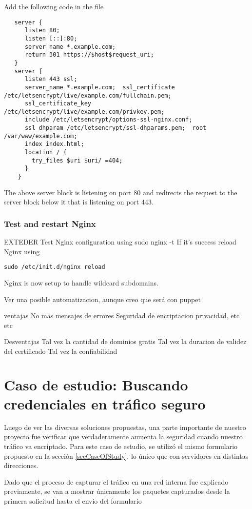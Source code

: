 Add the following code in the file

\begin{verbatim}
   server {
      listen 80;
      listen [::]:80;
      server_name *.example.com;
      return 301 https://$host$request_uri;
   }
   server {
      listen 443 ssl;
      server_name *.example.com;  ssl_certificate /etc/letsencrypt/live/example.com/fullchain.pem;
      ssl_certificate_key /etc/letsencrypt/live/example.com/privkey.pem;
      include /etc/letsencrypt/options-ssl-nginx.conf;
      ssl_dhparam /etc/letsencrypt/ssl-dhparams.pem;  root /var/www/example.com;
      index index.html;
      location / {
        try_files $uri $uri/ =404;
      }
    } 
\end{verbatim}

The above server block is listening on port 80 and redirects the request to the server block below 
it that is listening on port 443.

\subsubsection*{Test and restart Nginx}
EXTEDER
Test Nginx configuration using 
sudo nginx -t
If it’s success reload Nginx using 
\begin{verbatim}
sudo /etc/init.d/nginx reload
\end{verbatim}
Nginx is now setup to handle wildcard subdomains.

Ver una posible automatizacion, aunque creo que será con puppet

ventajas
No mas mensajes de errores
Seguridad de encriptacion 
privacidad, etc etc

Desventajas
Tal vez la cantidad de dominios gratis
Tal vez la duracion de validez del certificado
Tal vez la confiabilidad

\section{Caso de estudio: Buscando credenciales en tráfico seguro}

Luego de ver las diversas soluciones propuestas, una parte importante de 
nuestro proyecto fue verificar que verdaderamente aumenta la seguridad
cuando nuestro tráfico va encriptado. Para este caso de estudio, se utilizó
el mismo formulario propuesto en la sección \ref{secCaseOfStudy}, lo 
único que con servidores en distintas direcciones.

Dado que el proceso de capturar el tráfico en una red interna fue
explicado previamente, se van a mostrar únicamente los paquetes capturados
desde la primera solicitud hasta el envío del formulario

